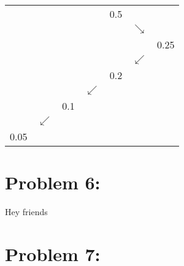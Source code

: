 \documentclass[12pt]{article}
\begin{document}
\begin{table}[H]
\centering
\label{my-label}
\begin{tabular}{lllllll}
     &  &     &  & 0.5 &  &      \\
     &  &     &  &     & {$\searrow$} &      \\
     &  &     &  &     &  & 0.25 \\
     &  &     &  &     & {$\swarrow$} &      \\
     &  &     &  & 0.2 &  &      \\
     &  &     & {$\swarrow$} &     &  &      \\
     &  & 0.1 &  &     &  &      \\
     & {$\swarrow$} &     &  &     &  &      \\
0.05 &  &     &  &     &  &     
\end{tabular}
\end{table}
\section*{Problem 6: }
Hey friends
\section*{Problem 7: }
\end{document}
